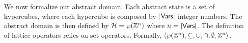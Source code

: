 %


We now formalize our abstract domain. Each abstract state is a set of hypercubes, where each hypercube is composed by $|\mathsf{Vars}|$ integer numbers. The abstract domain is then defined by $\mathcal{H} = \wp(\mathbb{Z}^n)$ where $n = |\mathsf{Vars}|$. The definition of lattice operators relies on set operators.
Formally, $\langle\wp(\mathbb{Z}^n), \subseteq, \cup, \cap, \emptyset, \mathbb{Z}^n\rangle$.


\vspace{-10pt}

